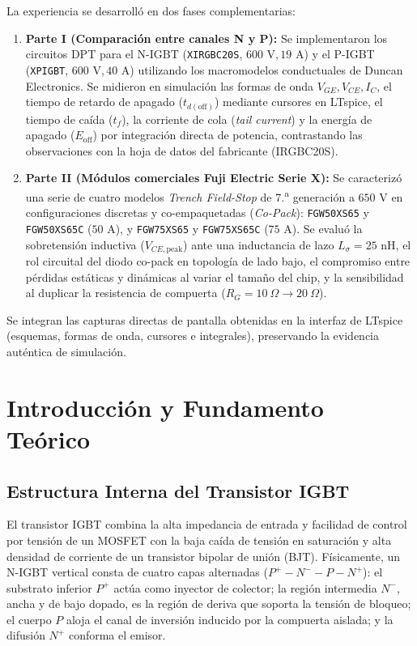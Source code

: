 \documentclass[11pt,a4paper]{article}
\begin{document}
La experiencia se desarrolló en dos fases complementarias:
\begin{enumerate}[leftmargin=*, noitemsep, topsep=2pt]
  \item \textbf{Parte I (Comparación entre canales N y P):} Se implementaron los circuitos DPT para el N-IGBT (\texttt{XIRGBC20S}, $600\text{ V}, 19\text{ A}$) y el P-IGBT (\texttt{XPIGBT}, $600\text{ V}, 40\text{ A}$) utilizando los macromodelos conductuales de Duncan Electronics. Se midieron en simulación las formas de onda $V_{GE}, V_{CE}, I_C$, el tiempo de retardo de apagado ($t_{d(\text{off})}$) mediante cursores en LTspice, el tiempo de caída ($t_f$), la corriente de cola (\textit{tail current}) y la energía de apagado ($E_{\text{off}}$) por integración directa de potencia, contrastando las observaciones con la hoja de datos del fabricante (IRGBC20S).
  \item \textbf{Parte II (Módulos comerciales Fuji Electric Serie X):} Se caracterizó una serie de cuatro modelos \textit{Trench Field-Stop} de 7.\textsuperscript{a} generación a $650\text{ V}$ en configuraciones discretas y co-empaquetadas (\textit{Co-Pack}): \texttt{FGW50XS65} y \texttt{FGW50XS65C} ($50\text{ A}$), y \texttt{FGW75XS65} y \texttt{FGW75XS65C} ($75\text{ A}$). Se evaluó la sobretensión inductiva ($V_{CE,\text{peak}}$) ante una inductancia de lazo $L_\sigma = 25\text{ nH}$, el rol circuital del diodo co-pack en topología de lado bajo, el compromiso entre pérdidas estáticas y dinámicas al variar el tamaño del chip, y la sensibilidad al duplicar la resistencia de compuerta ($R_G = 10\ \Omega \to 20\ \Omega$).
\end{enumerate}
Se integran las capturas directas de pantalla obtenidas en la interfaz de LTspice (esquemas, formas de onda, cursores e integrales), preservando la evidencia auténtica de simulación.

\section{Introducción y Fundamento Teórico}

\subsection{Estructura Interna del Transistor IGBT}
El transistor IGBT combina la alta impedancia de entrada y facilidad de control por tensión de un MOSFET con la baja caída de tensión en saturación y alta densidad de corriente de un transistor bipolar de unión (BJT). Físicamente, un N-IGBT vertical consta de cuatro capas alternadas ($P^+ - N^- - P - N^+$): el substrato inferior $P^+$ actúa como inyector de colector; la región intermedia $N^-$, ancha y de bajo dopado, es la región de deriva que soporta la tensión de bloqueo; el cuerpo $P$ aloja el canal de inversión inducido por la compuerta aislada; y la difusión $N^+$ conforma el emisor.
\end{document}
